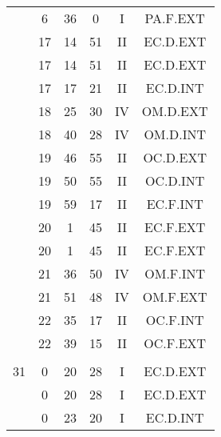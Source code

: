 \documentclass[12pt, a4paper]{article}
\begin{document}
\begin{multicols}{3}
{\begin{tabular}{c c c c c c}
	 	 	 	 & 6 & 36 & 0 & I & PA.F.EXT\\%
	 	 	 	 & 17 & 14 & 51 & II & EC.D.EXT\\%
	 	 	 	 & 17 & 14 & 51 & II & EC.D.EXT\\%
	 	 	 	 & 17 & 17 & 21 & II & EC.D.INT\\%
	 	 	 	 & 18 & 25 & 30 & IV & OM.D.EXT\\%
	 	 	 	 & 18 & 40 & 28 & IV & OM.D.INT\\%
	 	 	 	 & 19 & 46 & 55 & II & OC.D.EXT\\%
	 	 	 	 & 19 & 50 & 55 & II & OC.D.INT\\%
	 	 	 	 & 19 & 59 & 17 & II & EC.F.INT\\%
	 	 	 	 & 20 & 1 & 45 & II & EC.F.EXT\\%
	 	 	 	 & 20 & 1 & 45 & II & EC.F.EXT\\%
	 	 	 	 & 21 & 36 & 50 & IV & OM.F.INT\\%
	 	 	 	 & 21 & 51 & 48 & IV & OM.F.EXT\\%
	 	 	 	 & 22 & 35 & 17 & II & OC.F.INT\\%
	 	 	 	 & 22 & 39 & 15 & II & OC.F.EXT\\%
	 	 	 	 & & & & & \\%
	 	 	 	31 & 0 & 20 & 28 & I & EC.D.EXT\\%
	 	 	 	 & 0 & 20 & 28 & I & EC.D.EXT\\%
	 	 	 	 & 0 & 23 & 20 & I & EC.D.INT\\%
	 	 \end{tabular}
 	}
\end{multicols}
\end{document}
